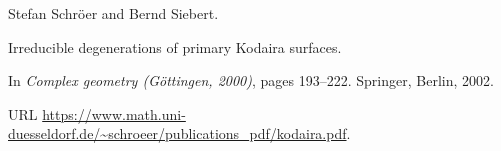 Stefan Schr{\"o}er and Bernd Siebert.

\newblock Irreducible degenerations of primary {Kodaira} surfaces.

\newblock In \emph{Complex geometry ({G}{\"o}ttingen, 2000)}, pages 193--222.
  Springer, Berlin, 2002.

\newblock URL
  \url{https://www.math.uni-duesseldorf.de/~schroeer/publications_pdf/kodaira.pdf}.